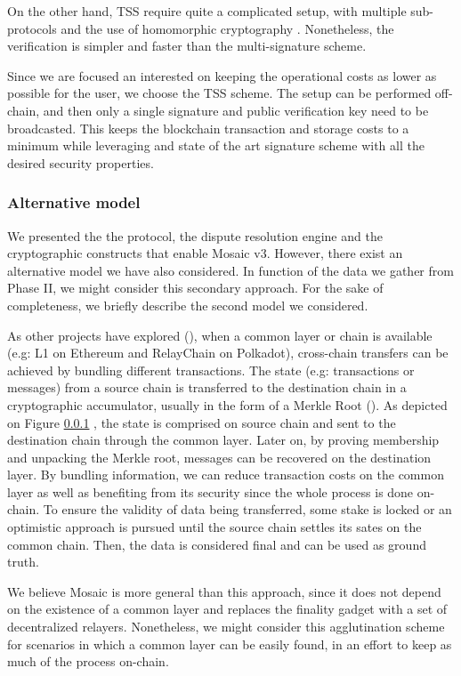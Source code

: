 On the other hand, TSS  require quite a complicated setup, with multiple sub-protocols and the use of homomorphic cryptography . Nonetheless, the verification is simpler and faster than the multi-signature scheme.

Since we are focused an interested on keeping the operational costs as lower as possible for the user, we choose the TSS scheme. The setup can be performed off-chain, and then only a single signature and public verification key need to be broadcasted. This keeps the blockchain transaction and storage costs to a minimum while leveraging and state of the art signature scheme with all the desired security properties.


\subsubsection{Alternative model}
We presented the the protocol, the dispute resolution engine and the cryptographic constructs that enable Mosaic v3. However, there exist an alternative model we have also considered. In function of the data we gather from Phase II, we might consider this secondary approach. For the sake of completeness, we briefly describe the second model we considered.

As other projects have explored (), when a common layer or chain is available (e.g: L1 on Ethereum and RelayChain on Polkadot), cross-chain transfers can be achieved by bundling different transactions. The state (e.g: transactions or messages) from a source chain is transferred to the destination chain in a cryptographic accumulator, usually in the form of a Merkle Root (). As depicted on Figure \ref{} , the state is comprised on source chain and sent to the destination chain through the common layer. Later on, by proving membership  and unpacking the Merkle root, messages can be recovered on the destination layer.  By bundling information, we can reduce transaction costs on the common layer as well as benefiting from its security since the whole process is done on-chain. To ensure the validity of data being transferred, some stake is locked or an optimistic approach is pursued until the source chain settles its sates on the common chain. Then, the data is considered final and can be used as ground truth.

We believe Mosaic is more general than this approach, since it does not depend on the existence of a common layer and replaces the finality gadget with a set of decentralized relayers. Nonetheless, we might consider this agglutination scheme for scenarios in which a common layer can be easily found, in an effort to keep as much of the process on-chain.